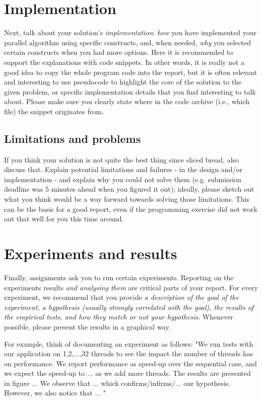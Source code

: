 \documentclass[a4paper,UKenglish,cleveref, autoref, thm-restate]{lipics-v2019}
\begin{document}
	\section{Implementation}
		Next, talk about your solution's \textit{implementation}: \textit{how} you have implemented your parallel algorithm using specific constructs, and, when needed, \textit{why} you selected certain constructs when you had more options. Here it is recommended to support the explanations with code snippets. In other words, it is really not a good idea to copy the whole program code into the report, but it is often relevant and interesting to use pseudocode to highlight the core of the solution to the given problem, or specific implementation details that you find interesting to talk about. Please make sure you clearly state where in the code archive (i.e., which file) the snippet originates from.

	\subsection{Limitations and problems}
		If you think your solution is not quite the best thing since sliced bread, also discuss that. Explain potential limitations and failures - in the design and/or implementation - and explain why you could not solve them (e.g. submission deadline was 5 minutes ahead when you figured it out); ideally, please sketch out what you think would be a way forward towards solving those limitations. This can be the basis for a good report, even if the programming exercise did not work out that well for you this time around.
		
	\section{Experiments and results}
		Finally, assignments ask you to run certain experiments. Reporting on the experiments results \textit{and analysing them} are critical parts of your report. For every experiment, we recommend that you provide \textit{a description of the goal of the experiment, a hypothesis (usually strongly correlated with the goal), the results of the empirical tests, and how they match or not your hypothesis}. Whenever possible, please present the results in a graphical way.
	
	For example, think of documenting an experiment as follows: "We run tests with our application on  1,2,...,32 threads to see the impact the number of threads has on performance. We report performance as speed-up over the  sequential case, and we expect the speed-up to ... as we add more threads. The results are presented in figure ...  We observe that ... which confirms/infirms/... our hypothesis. However, we also notice that ... " 
\end{document}
